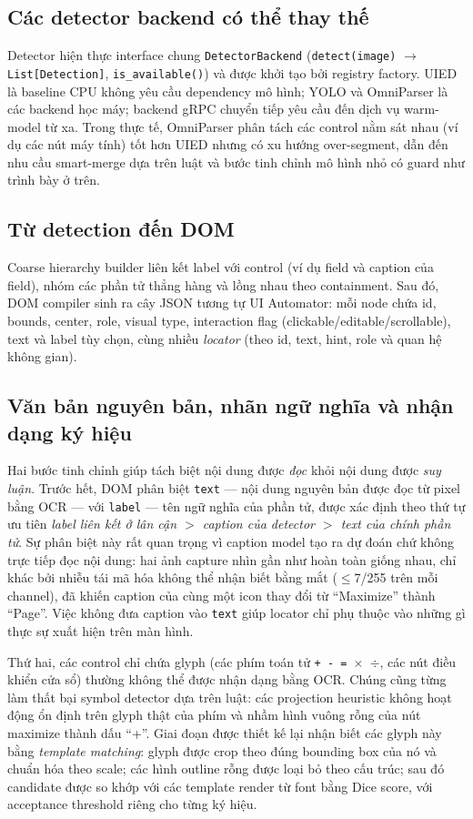 \documentclass[11pt,a4paper]{article}
\newcommand{\code}[1]{\texttt{#1}}
\begin{document}
\subsection{Các detector backend có thể thay thế}
Detector hiện thực interface chung \code{DetectorBackend}
(\code{detect(image)} $\rightarrow$ \code{List[Detection]}, \code{is\_available()})
và được khởi tạo bởi registry factory. UIED là baseline CPU không yêu cầu dependency
mô hình; YOLO và OmniParser là các backend học máy; backend gRPC chuyển tiếp yêu cầu
đến dịch vụ warm-model từ xa. Trong thực tế, OmniParser phân tách các control nằm
sát nhau (ví dụ các nút máy tính) tốt hơn UIED nhưng có xu hướng over-segment, dẫn
đến nhu cầu smart-merge dựa trên luật và bước tinh chỉnh mô hình nhỏ có guard như
trình bày ở trên.

\subsection{Từ detection đến DOM}
Coarse hierarchy builder liên kết label với control (ví dụ field và caption của
field), nhóm các phần tử thẳng hàng và lồng nhau theo containment. Sau đó, DOM
compiler sinh ra cây JSON tương tự UI Automator: mỗi node chứa id, bounds, center,
role, visual type, interaction flag (clickable/editable/scrollable), text và label
tùy chọn, cùng nhiều \emph{locator} (theo id, text, hint, role và quan hệ không
gian).


\subsection{Văn bản nguyên bản, nhãn ngữ nghĩa và nhận dạng ký hiệu}
Hai bước tinh chỉnh giúp tách biệt nội dung được \emph{đọc} khỏi nội dung được
\emph{suy luận}. Trước hết, DOM phân biệt \code{text} --- nội dung nguyên bản được
đọc từ pixel bằng OCR --- với \code{label} --- tên ngữ nghĩa của phần tử, được xác
định theo thứ tự ưu tiên \emph{label liên kết ở lân cận $>$ caption của detector
$>$ text của chính phần tử}. Sự phân biệt này rất quan trọng vì caption model tạo
ra dự đoán chứ không trực tiếp đọc nội dung: hai ảnh capture nhìn gần như hoàn toàn
giống nhau, chỉ khác bởi nhiễu tái mã hóa không thể nhận biết bằng mắt
($\leq$7/255 trên mỗi channel), đã khiến caption của cùng một icon thay đổi từ
``Maximize'' thành ``Page''. Việc không đưa caption vào \code{text} giúp locator
chỉ phụ thuộc vào những gì thực sự xuất hiện trên màn hình.

Thứ hai, các control chỉ chứa glyph (các phím toán tử
\code{+ - = $\times$ $\div$}, các nút điều khiển cửa sổ) thường không thể được
nhận dạng bằng OCR. Chúng cũng từng làm thất bại symbol detector dựa trên luật:
các projection heuristic không hoạt động ổn định trên glyph thật của phím và nhầm
hình vuông rỗng của nút maximize thành dấu ``+''. Giai đoạn được thiết kế lại nhận
biết các glyph này bằng \emph{template matching}: glyph được crop theo đúng
bounding box của nó và chuẩn hóa theo scale; các hình outline rỗng được loại bỏ
theo cấu trúc; sau đó candidate được so khớp với các template render từ font bằng
Dice score, với acceptance threshold riêng cho từng ký hiệu.
\end{document}
